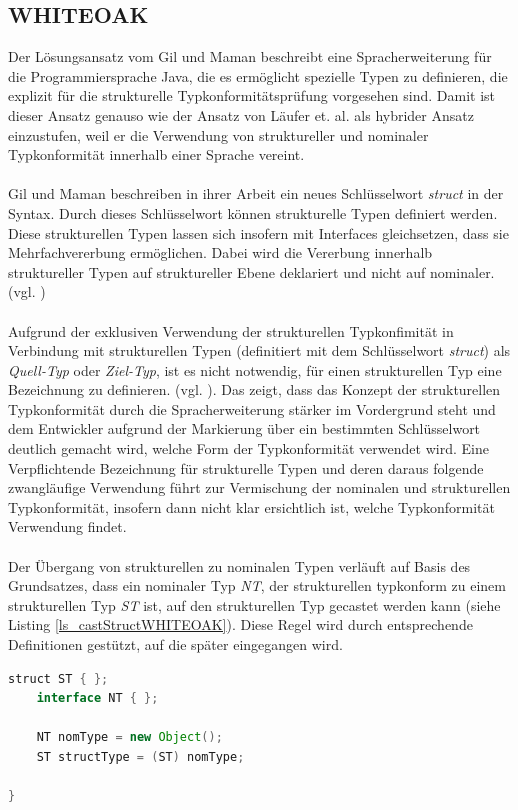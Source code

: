 \documentclass[11pt, 
ngerman,
doublespacing,
chapterinoneline, %
consistentlayout, %
]{scrartcl}
\begin{document}
\subsection{WHITEOAK}
Der Lösungsansatz vom Gil und Maman \cite{whiteoak} beschreibt eine Spracherweiterung für die Programmiersprache Java, die es ermöglicht spezielle Typen zu definieren, die explizit für die strukturelle Typkonformitätsprüfung vorgesehen sind. Damit ist dieser Ansatz genauso wie der Ansatz von Läufer et. al. \cite{structconfjava} als hybrider Ansatz einzustufen, weil er die Verwendung von struktureller und nominaler Typkonformität innerhalb einer Sprache vereint.\\\\
Gil und Maman beschreiben in ihrer Arbeit ein neues Schlüsselwort \emph{struct} in der Syntax. Durch dieses Schlüsselwort können strukturelle Typen definiert werden. Diese strukturel\-len Typen lassen sich insofern mit Interfaces gleichsetzen, dass sie Mehrfachvererbung ermöglichen. Dabei wird die Vererbung innerhalb struktureller Typen auf struktureller Ebene deklariert und nicht auf nominaler.  (vgl. \cite{whiteoak})\\\\
Aufgrund der exklusiven Verwendung der strukturellen Typkonfimität in Verbindung mit strukturellen Typen (definitiert mit dem Schlüsselwort \emph{struct}) als \emph{Quell-Typ} oder \emph{Ziel-Typ}, ist es nicht notwendig, für einen strukturellen Typ eine Bezeichnung zu definieren. (vgl. \cite{whiteoak}). Das zeigt, dass das Konzept der strukturellen Typkonformität durch die Spracherweiterung stärker im Vordergrund steht und dem Entwickler aufgrund der Mar\-kie\-rung über ein bestimmten Schlüsselwort deutlich gemacht wird, welche Form der Typkonformität verwendet wird. Eine Verpflichtende Bezeichnung für strukturelle Typen und deren daraus folgende zwangläufige Verwendung führt zur Vermischung der nomina\-len und strukturellen Typkonformität, insofern dann nicht klar ersichtlich ist, welche Typkon\-formität Verwendung findet.\\\\
Der Übergang von strukturellen zu nominalen Typen verläuft auf Basis des Grundsatzes, dass ein nominaler Typ \emph{NT}, der strukturellen typkonform zu einem strukturellen Typ \emph{ST} ist, auf den strukturellen Typ gecastet werden kann (siehe Listing \ref{ls_castStructWHITEOAK}). Diese Regel wird durch entsprechende Definitionen gestützt, auf die später eingegangen wird.\\
\begin{lstlisting}[language=Java, label=ls_castStructWHITEOAK, caption=Strukturelle Typen auf nominale Typen casten]
	struct ST { };
	interface NT { };
	
	NT nomType = new Object(); 
	ST structType = (ST) nomType;
		
}
\end{lstlisting}
\end{document}
